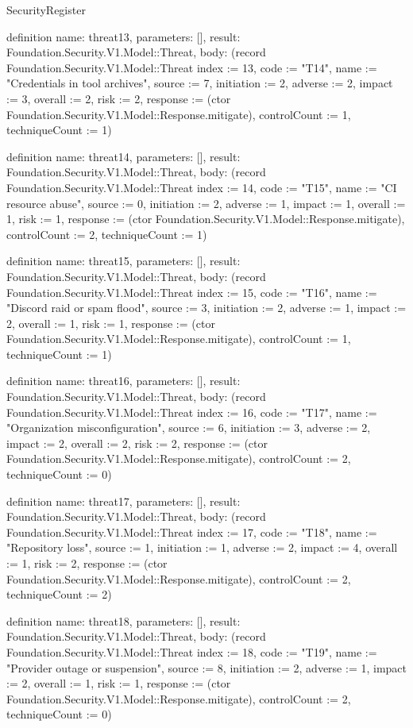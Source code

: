\begin{lexlean}{SecurityRegister}
\begin{semanticmodule}
definition{
  name: threat13,
  parameters: [],
  result: Foundation.Security.V1.Model::Threat,
  body: (record Foundation.Security.V1.Model::Threat {index := 13, code := "T14", name := "Credentials in tool archives", source := 7, initiation := 2, adverse := 2, impact := 3, overall := 2, risk := 2, response := (ctor Foundation.Security.V1.Model::Response.mitigate), controlCount := 1, techniqueCount := 1})
}

definition{
  name: threat14,
  parameters: [],
  result: Foundation.Security.V1.Model::Threat,
  body: (record Foundation.Security.V1.Model::Threat {index := 14, code := "T15", name := "CI resource abuse", source := 0, initiation := 2, adverse := 1, impact := 1, overall := 1, risk := 1, response := (ctor Foundation.Security.V1.Model::Response.mitigate), controlCount := 2, techniqueCount := 1})
}

definition{
  name: threat15,
  parameters: [],
  result: Foundation.Security.V1.Model::Threat,
  body: (record Foundation.Security.V1.Model::Threat {index := 15, code := "T16", name := "Discord raid or spam flood", source := 3, initiation := 2, adverse := 1, impact := 2, overall := 1, risk := 1, response := (ctor Foundation.Security.V1.Model::Response.mitigate), controlCount := 1, techniqueCount := 1})
}

definition{
  name: threat16,
  parameters: [],
  result: Foundation.Security.V1.Model::Threat,
  body: (record Foundation.Security.V1.Model::Threat {index := 16, code := "T17", name := "Organization misconfiguration", source := 6, initiation := 3, adverse := 2, impact := 2, overall := 2, risk := 2, response := (ctor Foundation.Security.V1.Model::Response.mitigate), controlCount := 2, techniqueCount := 0})
}

definition{
  name: threat17,
  parameters: [],
  result: Foundation.Security.V1.Model::Threat,
  body: (record Foundation.Security.V1.Model::Threat {index := 17, code := "T18", name := "Repository loss", source := 1, initiation := 1, adverse := 2, impact := 4, overall := 1, risk := 2, response := (ctor Foundation.Security.V1.Model::Response.mitigate), controlCount := 2, techniqueCount := 2})
}

definition{
  name: threat18,
  parameters: [],
  result: Foundation.Security.V1.Model::Threat,
  body: (record Foundation.Security.V1.Model::Threat {index := 18, code := "T19", name := "Provider outage or suspension", source := 8, initiation := 2, adverse := 1, impact := 2, overall := 1, risk := 1, response := (ctor Foundation.Security.V1.Model::Response.mitigate), controlCount := 2, techniqueCount := 0})
}


\end{semanticmodule}
\end{lexlean}
